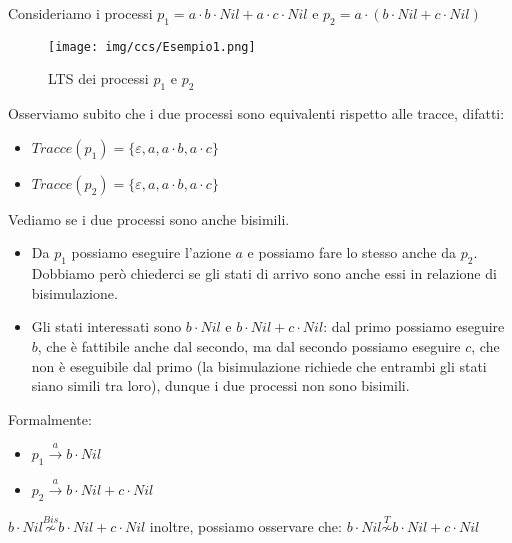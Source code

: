 \begin{esempio}
    Consideriamo i processi $p_1 = a \cdot b \cdot Nil + a \cdot c \cdot Nil$ e
    $p_2 = a \cdot (b \cdot Nil + c \cdot Nil)$
    \begin{figure}[!ht]
        \centering
        \texttt{[image: img/ccs/Esempio1.png]}
        \caption{LTS dei processi $p_1$ e $p_2$}
    \end{figure}
    Osserviamo subito che i due processi sono equivalenti rispetto alle tracce,
    difatti:
    \begin{itemize}
        \item $Tracce(p_1) = \{\varepsilon, a, a \cdot b, a \cdot c\}$
        \item $Tracce(p_2) = \{\varepsilon, a, a \cdot b, a \cdot c\}$
    \end{itemize}
    Vediamo se i due processi sono anche bisimili.
    \begin{itemize}
        \item Da $p_1$ possiamo eseguire l'azione $a$ e possiamo fare lo stesso
              anche da $p_2$. Dobbiamo però chiederci se gli stati di arrivo sono
              anche essi in relazione di bisimulazione.
        \item Gli stati interessati sono $b \cdot Nil$ e $b \cdot Nil + c \cdot
                  Nil$: dal primo possiamo eseguire $b$, che è fattibile anche
              dal secondo, ma dal secondo possiamo eseguire $c$, che non è
              eseguibile dal primo (la bisimulazione richiede che entrambi gli
              stati siano simili tra loro), dunque i due processi non sono bisimili.
    \end{itemize}
    Formalmente:
    \begin{itemize}
        \item $p_1 \xrightarrow{a} b \cdot Nil$
        \item $p_2 \xrightarrow{a} b \cdot Nil + c \cdot Nil$
    \end{itemize}
    $b \cdot Nil \stackrel{Bis}{\not\sim} b \cdot Nil + c \cdot Nil$ inoltre,
    possiamo osservare che: $b \cdot Nil \stackrel{T}{\not\sim} b \cdot Nil + c 
    \cdot Nil$
\end{esempio}
